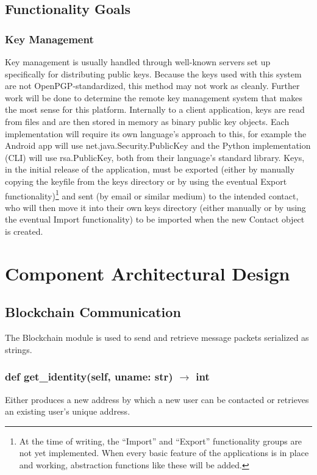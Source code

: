 \documentclass[titlepage]{report}
\begin{document}
\subsection{Functionality Goals}
\subsubsection{Key Management}
Key management is usually handled through well-known servers set up specifically for distributing public keys. Because the keys used with this system are not OpenPGP-standardized, this method may not work as cleanly. Further work will be done to determine the remote key management system that makes the most sense for this platform. Internally to a client application, keys are read from files and are then stored in memory as binary public key objects. Each implementation will require its own language's approach to this, for example the Android app will use net.java.Security.PublicKey and the Python implementation (CLI) will use rsa.PublicKey, both from their language's standard library. Keys, in the initial release of the application, must be exported (either by manually copying the keyfile from the keys directory or by using the eventual Export functionality)\footnote{At the time of writing, the ``Import'' and ``Export'' functionality groups are not yet implemented. When every basic feature of the applications is in place and working, abstraction functions like these will be added.} and sent (by email or similar medium) to the intended contact, who will then move it into their own keys directory (either manually or by using the eventual Import functionality) to be imported when the new Contact object is created.

\section{Component Architectural Design}

\subsection{Blockchain Communication}
The Blockchain module is used to send and retrieve message packets serialized as strings.

\subsubsection{def get\_identity(self, uname: str) $\rightarrow$ int}
Either produces a new address by which a new user can be contacted or retrieves an existing user's unique address.
\end{document}
